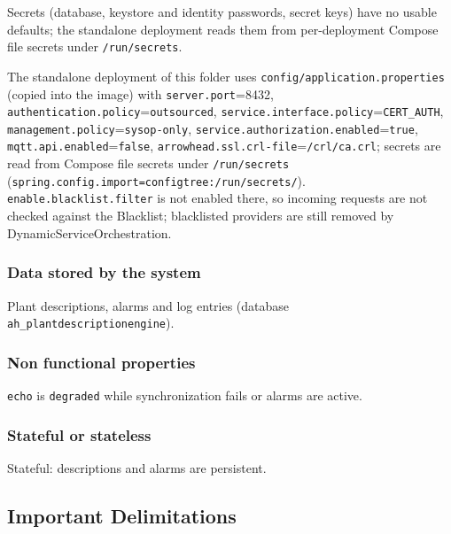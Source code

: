 \documentclass[a4paper]{arrowhead}
\begin{document}
Secrets (database, keystore and identity passwords, secret keys) have no usable defaults; the standalone deployment reads them from per-deployment Compose file secrets under \texttt{/\allowbreak{}run/\allowbreak{}secrets}.

The standalone deployment of this folder uses \texttt{config/\allowbreak{}application.\allowbreak{}properties} (copied into the image) with \texttt{server.\allowbreak{}port}=8432, \texttt{authentication.\allowbreak{}policy}=\texttt{outsourced}, \texttt{service.\allowbreak{}interface.\allowbreak{}policy}=\texttt{CERT\_AUTH}, \texttt{management.\allowbreak{}policy}=\texttt{sysop-\allowbreak{}only}, \texttt{service.\allowbreak{}authorization.\allowbreak{}enabled}=\texttt{true}, \texttt{mqtt.\allowbreak{}api.\allowbreak{}enabled}=\texttt{false}, \texttt{arrowhead.\allowbreak{}ssl.\allowbreak{}crl-\allowbreak{}file}=\texttt{/\allowbreak{}crl/\allowbreak{}ca.\allowbreak{}crl}; secrets are read from Compose file secrets under \texttt{/\allowbreak{}run/\allowbreak{}secrets} (\texttt{spring.\allowbreak{}config.\allowbreak{}import=\allowbreak{}configtree:\allowbreak{}/\allowbreak{}run/\allowbreak{}secrets/}). \texttt{enable.\allowbreak{}blacklist.\allowbreak{}filter} is not enabled there, so incoming requests are not checked against the Blacklist; blacklisted providers are still removed by Dynamic\allowbreak{}Service\allowbreak{}Orchestration.

\subsubsection{Data stored by the system}

Plant descriptions, alarms and log entries (database \texttt{ah\_\allowbreak{}plantdescriptionengine}).

\subsubsection{Non functional properties}

\texttt{echo} is \texttt{degraded} while synchronization fails or alarms are active.

\subsubsection{Stateful or stateless}

Stateful: descriptions and alarms are persistent.

\subsection{Important Delimitations}
\label{sec:delimitations}
\end{document}
